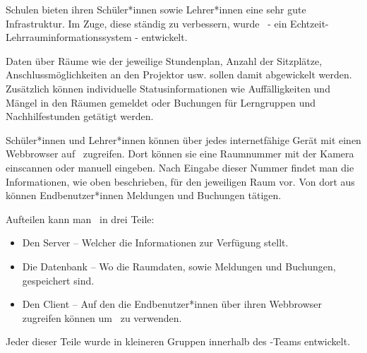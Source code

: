 
Schulen bieten ihren Schüler*innen sowie Lehrer*innen eine sehr gute Infrastruktur. Im Zuge, diese ständig zu verbessern, wurde \ZELIA\ - ein Echtzeit-Lehr\-raum\-informations\-system - entwickelt. 

Daten über Räume wie der jeweilige Stundenplan, Anzahl der Sitzplätze, Anschlussmöglichkeiten an den Projektor usw. sollen damit abgewickelt werden. Zusätzlich können individuelle Statusinformationen wie Auffälligkeiten und Mängel in den Räumen gemeldet oder Buchungen für Lerngruppen und Nachhilfestunden getätigt werden.

Schüler*innen und Lehrer*innen können über jedes internetfähige Gerät mit einen Webbrowser auf \ZELIA\ zugreifen. Dort können sie eine Raumnummer mit der Kamera einscannen oder manuell eingeben. Nach Eingabe dieser Nummer findet man die Informationen, wie oben beschrieben, für den jeweiligen Raum vor. Von dort aus können Endbenutzer*innen Meldungen und Buchungen tätigen.

Aufteilen kann man \ZELIA\ in drei Teile:
\begin{itemize}
    \item Den Server -- Welcher die Informationen zur Verfügung stellt.
    \item Die Datenbank -- Wo die Raumdaten, sowie Meldungen und Buchungen, gespeichert sind.
    \item Den Client -- Auf den die Endbenutzer*innen über ihren Webbrowser zugreifen können um \ZELIA\ zu verwenden.
\end{itemize}

Jeder dieser Teile wurde in kleineren Gruppen innerhalb des \ZELIA-Teams entwickelt.
